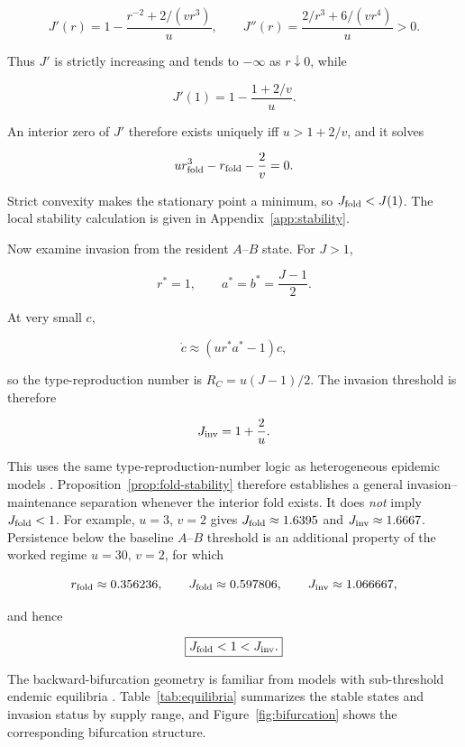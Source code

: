 \documentclass[11pt,a4paper]{article}
\begin{document}
\[
J'(r)=1-\frac{r^{-2}+2/(vr^3)}{u},
\qquad
J''(r)=\frac{2/r^3+6/(vr^4)}{u}>0.
\]

Thus $J'$ is strictly increasing and tends to $-\infty$ as $r\downarrow0$, while

\[
J'(1)=1-\frac{1+2/v}{u}.
\]

An interior zero of $J'$ therefore exists uniquely iff $u>1+2/v$, and it solves

\begin{equation}
ur_{\rm fold}^3-r_{\rm fold}-\frac{2}{v}=0.
\label{eq:fold-general}
\end{equation}

Strict convexity makes the stationary point a minimum, so $J_{\rm fold}<J(1)$. The local stability calculation is given in Appendix~\ref{app:stability}.

Now examine invasion from the resident $A$--$B$ state. For $J>1$,

\[
r^*=1,
\qquad
a^*=b^*=\frac{J-1}{2}.
\]

At very small $c$,

\[
\dot c\approx(ur^*a^*-1)c,
\]

so the type-reproduction number is $R_C=u(J-1)/2$. The invasion threshold is therefore

\begin{equation}
J_{\rm inv}=1+\frac{2}{u}.
\label{eq:Jinv}
\end{equation}

This uses the same type-reproduction-number logic as heterogeneous epidemic models \citep{Heesterbeek2007}. Proposition~\ref{prop:fold-stability} therefore establishes a general invasion--maintenance separation whenever the interior fold exists. It does \emph{not} imply $J_{\rm fold}<1$. For example, $u=3$, $v=2$ gives $J_{\rm fold}\approx1.6395$ and $J_{\rm inv}\approx1.6667$. Persistence below the baseline $A$--$B$ threshold is an additional property of the worked regime $u=30$, $v=2$, for which

\[
r_{\rm fold}\approx0.356236,
\qquad
J_{\rm fold}\approx0.597806,
\qquad
J_{\rm inv}\approx1.066667,
\]

and hence

\[
\boxed{J_{\rm fold}<1<J_{\rm inv}.}
\]

The backward-bifurcation geometry is familiar from models with sub-threshold endemic equilibria \citep{KribsZaleta2000,VandenDriessche2002}. Table~\ref{tab:equilibria} summarizes the stable states and invasion status by supply range, and Figure~\ref{fig:bifurcation} shows the corresponding bifurcation structure.
\end{document}
